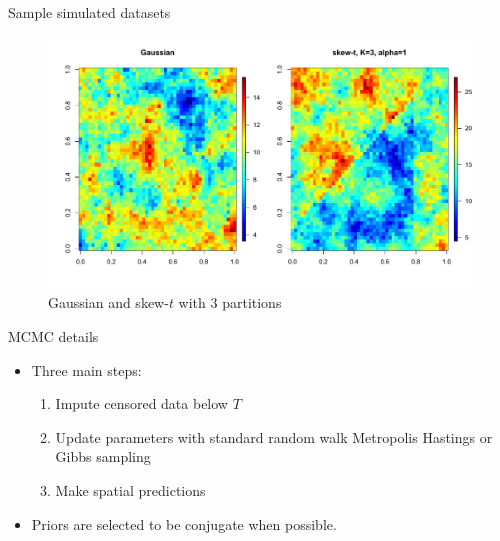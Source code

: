 \documentclass{beamer}
\begin{document}
\begin{frame}{Sample simulated datasets}
  \centering
  \begin{figure}
  \includegraphics[width=1\linewidth]{./plots/gauss-vs-skew-t3.pdf}
  \caption{Gaussian and skew-$t$ with 3 partitions}
  \end{figure}
\end{frame}

\begin{frame}{MCMC details}
  \begin{itemize} \setlength{\itemsep}{0.5em}
    \item Three main steps:
    \begin{enumerate}[1.]
      \item Impute censored data below $T$
      \item Update parameters with standard random walk Metropolis Hastings or Gibbs sampling
      \item Make spatial predictions
    \end{enumerate}
    \item Priors are selected to be conjugate when possible.
  \end{itemize}
\end{frame}
\end{document}

